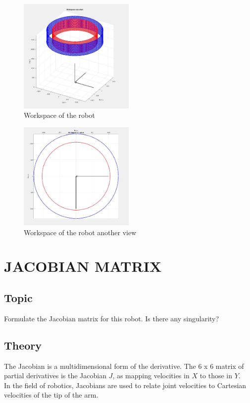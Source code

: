 \begin{figure}[H]
    \centering
    \includegraphics[width=0.5\textwidth]{pictures/workspace1.png} 
    \caption{Workspace of the robot}
\end{figure}
\begin{figure}[H]
    \centering
    \includegraphics[width=0.5\textwidth]{pictures/workspace2.png} 
    \caption{Workspace of the robot another view}
\end{figure}
\chapter{JACOBIAN MATRIX}
\section{Topic}
Formulate the Jacobian matrix for this robot. Is there any singularity?
\section{Theory}
The Jacobian is a multidimensional form of the derivative. The 6 x 6 matrix of partial derivatives is the Jacobian $J$, as mapping velocities in $X$ to those in $Y$. \\
In the field of robotics, Jacobians are used to relate joint velocities to Cartesian velocities of the tip of the arm.

